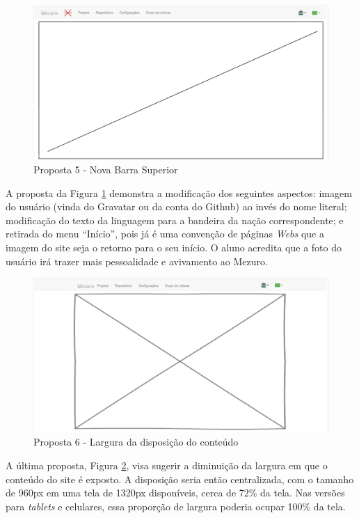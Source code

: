 \begin{figure}[!htb]
	\centering
    \includegraphics[keepaspectratio=true,scale=0.45]
    {figuras/barra-superior.eps}
  \caption{Proposta 5 - Nova Barra Superior}
  \label{fig:barra-superior}
\end{figure}

A proposta da Figura \ref{fig:barra-superior} demonstra a modificação dos
seguintes aspectos: imagem do usuário (vinda do Gravatar ou da conta do Github)
ao invés do nome literal; modificação do texto da linguagem para a bandeira da
nação correspondente; e retirada do menu ``Início'', pois já é uma convenção de
páginas \textit{Webs} que a imagem do site seja o retorno para o seu início.
O aluno acredita que a foto do usuário irá trazer mais pessoalidade e avivamento
ao Mezuro.

\begin{figure}[!htb]
	\centering
    \includegraphics[keepaspectratio=true,scale=0.45]
    {figuras/size_content_1.eps}
  \caption{Proposta 6 - Largura da disposição do conteúdo}
  \label{fig:size_content_1}
\end{figure}

\newpage

A última proposta, Figura \ref{fig:size_content_1}, visa sugerir a diminuição da
largura em que o conteúdo do site é exposto. A disposição seria então
centralizada, com o tamanho de 960px em uma tela de 1320px disponíveis, cerca de
72\% da tela. Nas versões para \textit{tablets} e celulares, essa proporção de
largura poderia ocupar 100\% da tela.

